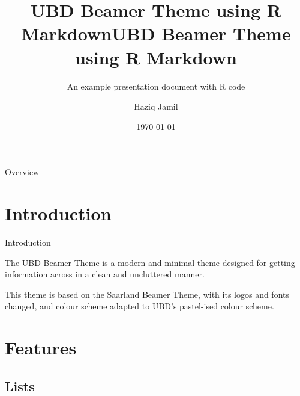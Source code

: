 \documentclass[,]{beamer}
\author{Haziq Jamil}
\title{UBD Beamer Theme using R Markdown}
\title{UBD Beamer Theme using R Markdown}
\subtitle{An example presentation document with R code}
\institute{Mathematical Sciences, Faculty of Science, UBD\\
\url{https://haziqj.ml}}
\date{\today}
\begin{document}
\begin{frame}
	\titlepage
\end{frame}

\begin{frame}{Overview}
	\tableofcontents
\end{frame}

\hypertarget{introduction}{%
\section{Introduction}\label{introduction}}

\begin{frame}{Introduction}
\protect\hypertarget{introduction-1}{}

The UBD Beamer Theme is a modern and minimal theme designed for getting
information across in a clean and uncluttered manner.

This theme is based on the
\href{https://github.com/kailashbuki/beamerthemesaarland}{Saarland
Beamer Theme}, with its logos and fonts changed, and colour scheme
adapted to UBD's pastel-ised colour scheme.

\end{frame}

\hypertarget{features}{%
\section{Features}\label{features}}

\hypertarget{lists}{%
\subsection{Lists}\label{lists}}
\end{document}
